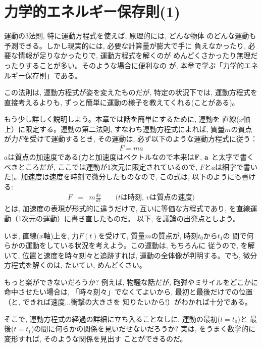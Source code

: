 \chapter{力学的エネルギー保存則(1)}\label{chapt:consenergy1}

運動の3法則, 特に運動方程式を使えば, 原理的には, どんな物体
のどんな運動も予測できる。しかし現実的には, 必要な計算量が膨大で手に
負えなかったり, 必要な情報が足りなかったりで, 運動方程式を解くのが
めんどくさかったり無理だったりすることが多い。そのような場合に便利なの
が, 本章で学ぶ「力学的エネルギー保存則」である。

この法則は, 運動方程式が姿を変えたものだが, 特定の状況下では, 
運動方程式を直接考えるよりも, ずっと簡単に運動の様子を教えてくれる(ことがある)。

もう少し詳しく説明しよう。本章では話を簡単にするために, 運動を
直線($x$軸上）に限定する。運動の第二法則, すなわち運動方程式によれば, 
質量$m$の質点が力$F$を受けて運動するとき, その運動は, 必ず以下のような運動方程式に従う：
\begin{eqnarray}F=ma\label{eq:F_ma_energy0}\end{eqnarray}
$a$は質点の加速度である(力と加速度はベクトルなので本来は${\bf F}$, ${\bf a}$
と太字で書くべきところだが, ここでは運動が1次元に限定されているので, 
$F$と$a$は細字で書いた)。加速度は速度を時刻で微分したものなので, この式は, 
以下のようにも書ける:
\begin{eqnarray}
F&=&m\frac{dv}{dt}\quad\quad\text{($t$は時刻, $v$は質点の速度)}\label{eq:F_ma_energy1}
\end{eqnarray}
とは, 加速度の表現が形式的に違うだけで, 
互いに等価な方程式であり, を直線運動（1次元の運動）に書き直したものだ。
以下, を議論の出発点としよう。\mv

いま, 直線($x$軸)上を, 力$F(t)$を受けて, 質量$m$の質点が, 時刻$t_0$から$t_1$の
間で何らかの運動をしている状況を考えよう。この運動は, もちろんに
従うので, を解いて, 位置と速度を時々刻々と追跡すれば, 
運動の全体像が判明する。でも, 微分方程式を解くのは, たいてい, めんどくさい。

もっと楽ができないだろうか? 例えば, 物騒な話だが, 
砲弾やミサイルをどこかに命中させたい場合は, 「時々刻々」でなくてよいから, 
最初と最後だけでの位置（と, できれば速度...衝撃の大きさを
知りたいから!）がわかれば十分である。

そこで, 運動方程式の経過の詳細に立ち入ることなしに, 運動の最初($t=t_0$)と
最後($t=t_1$)の間に何らかの関係を見いだせないだろうか? 実は, 
をうまく数学的に変形すれば, そのような関係を見出す
ことができるのだ。


